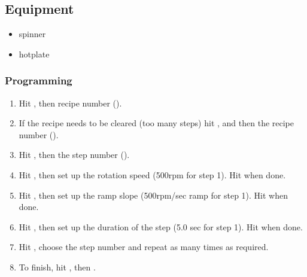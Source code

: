 \subsection{Equipment}
\begin{itemize}[noitemsep]
	\item spinner
	\item hotplate
\end{itemize}

\subsubsection{Programming}
\begin{enumerate}
  \item Hit , then recipe number ().
  \item If the recipe needs to be cleared (too many steps) hit ,  and then the recipe number ().
  \item Hit , then the step number ().
  \item Hit , then set up the rotation speed (500rpm for step 1). Hit  when done.
  \item Hit , then set up the ramp slope (500rpm/sec ramp for step 1). Hit  when done.
  \item Hit , then set up the duration of the step (5.0 sec for step 1). Hit  when done.
  \item Hit , choose the step number and repeat as many times as required.
  \item To finish, hit , then .
\end{enumerate}

